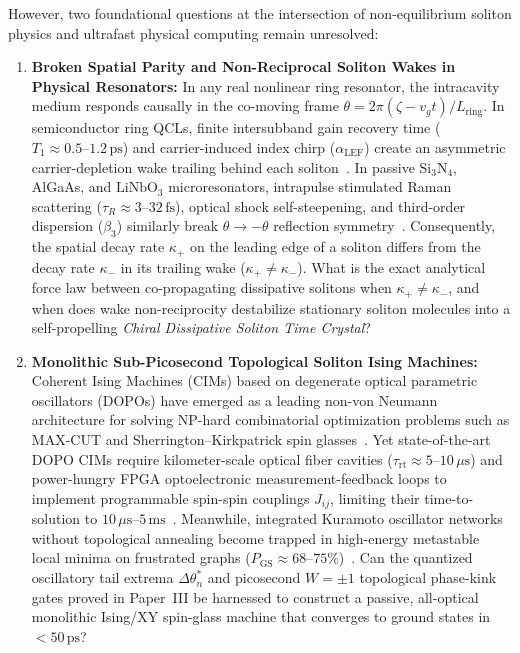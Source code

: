 \documentclass[11pt,letterpaper]{article}
\begin{document}
However, two foundational questions at the intersection of non-equilibrium soliton physics and ultrafast physical computing remain unresolved:
\begin{enumerate}
    \item \textbf{Broken Spatial Parity and Non-Reciprocal Soliton Wakes in Physical Resonators:} In any real nonlinear ring resonator, the intracavity medium responds causally in the co-moving frame $\theta = 2\pi(\zeta - v_g t)/L_{\mathrm{ring}}$. In semiconductor ring QCLs, finite intersubband gain recovery time ($T_1 \approx 0.5\text{--}1.2\,\mathrm{ps}$) and carrier-induced index chirp ($\alpha_{\mathrm{LEF}}$) create an asymmetric carrier-depletion wake trailing behind each soliton~\cite{Columbo2021,Kazakov2025}. In passive $\mathrm{Si_3N_4}$, AlGaAs, and $\mathrm{LiNbO_3}$ microresonators, intrapulse stimulated Raman scattering ($\tau_R \approx 3\text{--}32\,\mathrm{fs}$), optical shock self-steepening, and third-order dispersion ($\beta_3$) similarly break $\theta \to -\theta$ reflection symmetry~\cite{Kippenberg2018,Skryabin2020,Cole2017}. Consequently, the spatial decay rate $\kappa_+$ on the leading edge of a soliton differs from the decay rate $\kappa_-$ in its trailing wake ($\kappa_+ \neq \kappa_-$). What is the exact analytical force law between co-propagating dissipative solitons when $\kappa_+ \neq \kappa_-$, and when does wake non-reciprocity destabilize stationary soliton molecules into a self-propelling \textit{Chiral Dissipative Soliton Time Crystal}?
    \item \textbf{Monolithic Sub-Picosecond Topological Soliton Ising Machines:} Coherent Ising Machines (CIMs) based on degenerate optical parametric oscillators (DOPOs) have emerged as a leading non-von Neumann architecture for solving NP-hard combinatorial optimization problems such as MAX-CUT and Sherrington--Kirkpatrick spin glasses~\cite{Marandi2014,Inagaki2016,McMahon2016,Yamamoto2017}. Yet state-of-the-art DOPO CIMs require kilometer-scale optical fiber cavities ($\tau_{\mathrm{rt}} \approx 5\text{--}10\,\mu\mathrm{s}$) and power-hungry FPGA optoelectronic measurement-feedback loops to implement programmable spin-spin couplings $J_{ij}$, limiting their time-to-solution to $10\,\mu\mathrm{s}\text{--}5\,\mathrm{ms}$~\cite{Inagaki2016,Yamamoto2017,Mohseni2022}. Meanwhile, integrated Kuramoto oscillator networks without topological annealing become trapped in high-energy metastable local minima on frustrated graphs ($P_{\mathrm{GS}} \approx 68\text{--}75\%$)~\cite{Okawachi2020,Kalinin2018}. Can the quantized oscillatory tail extrema $\Delta\theta_n^*$ and picosecond $W = \pm 1$ topological phase-kink gates proved in Paper~III be harnessed to construct a passive, all-optical monolithic Ising/XY spin-glass machine that converges to ground states in $<50\,\mathrm{ps}$?
\end{enumerate}
\end{document}
